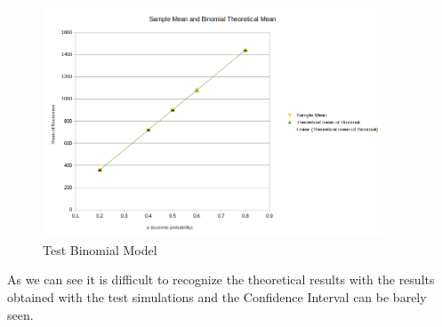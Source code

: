 \begin{figure}[H]
	\centering
	\includegraphics[width=0.9\textwidth]{img/plotTheoreticalMeanBinomial.png}
	\caption{Test Binomial Model}
	\label {img: consistencyTest1b}
\end{figure}

As we can see it is difficult to recognize the theoretical results with the results obtained with the test simulations and the Confidence Interval can be barely seen.


